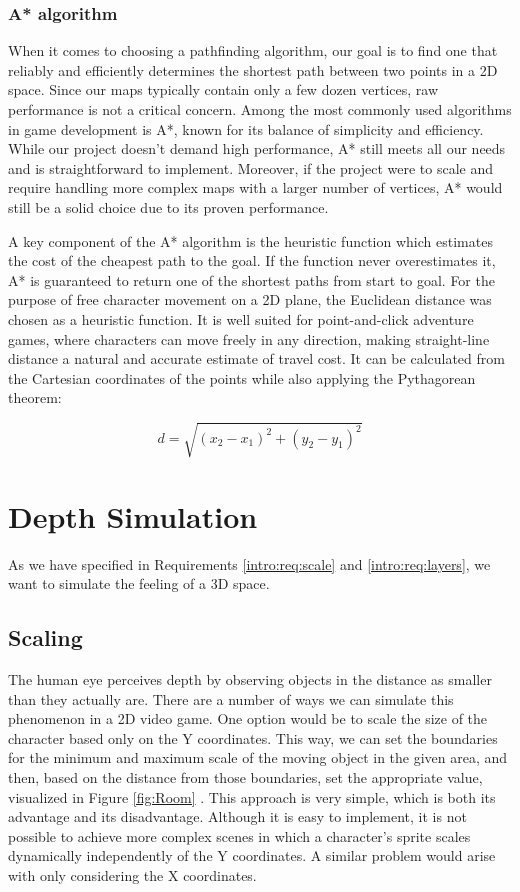\subsubsection{A* algorithm}
When it comes to choosing a pathfinding algorithm, our goal is to find one that reliably and efficiently determines the shortest path between two points in a 2D space. Since our maps typically contain only a few dozen vertices, raw performance is not a critical concern. Among the most commonly used algorithms in game development is A*, known for its balance of simplicity and efficiency. While our project doesn’t demand high performance, A* still meets all our needs and is straightforward to implement. Moreover, if the project were to scale and require handling more complex maps with a larger number of vertices, A* would still be a solid choice due to its proven performance. 

A key component of the A* algorithm is the heuristic function which estimates the cost of the cheapest path to the goal. If the function never overestimates it, A* is guaranteed to return one of the shortest paths from start to goal. For the purpose of free character movement on a 2D plane, the Euclidean distance was chosen as a heuristic function. It is well suited for point-and-click adventure games, where characters can move freely in any direction, making straight-line distance a natural and accurate estimate of travel cost.  It can be calculated from the Cartesian coordinates of the points while also applying the Pythagorean theorem:

\[
d = \sqrt{(x_2 - x_1)^2 + (y_2 - y_1)^2}
\]

\section{Depth Simulation}
As we have specified in Requirements \ref{intro:req:scale} and \ref{intro:req:layers}, we want to simulate the feeling of a 3D space. 

\subsection{Scaling}
\label{analysis:depth:scaling}
The human eye perceives depth by observing objects in the distance as smaller than they actually are. There are a number of ways we can simulate this phenomenon in a 2D video game. One option would be to scale the size of the character based only on the Y coordinates. This way, we can set the boundaries for the minimum and maximum scale of the moving object in the given area, and then, based on the distance from those boundaries, set the appropriate value, visualized in Figure \ref{fig:Room} . This approach is very simple, which is both its advantage and its disadvantage. Although it is easy to implement, it is not possible to achieve more complex scenes in which a character's sprite scales dynamically independently of the Y coordinates. A similar problem would arise with only considering the X coordinates.


